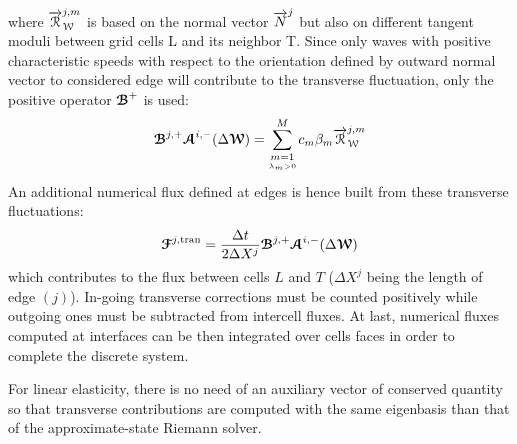 where ${\overrightarrow{\mathcal{R}}}_{\mathcal{W}}^{j,m}$ is based on the normal vector ${\overrightarrow{N}}^j$ but also on different tangent moduli between grid cells L and its neighbor T. Since only waves with positive characteristic speeds with respect to the orientation defined by outward normal vector to considered edge will contribute to the transverse fluctuation, only the positive operator ${\boldsymbol{\mathcal{B}}}^+$ is used:
\begin{equation}
{\boldsymbol{\mathcal{B}}}^{j,+} {\boldsymbol{\mathcal{A}}}^{i,-}(\Delta {\boldsymbol{\mathcal{W}}}) = \sum_{\underset{\lambda_m >0}{m=1}}^{M} c_m \beta_m {\overrightarrow{\mathcal{R}}}_{\mathcal{W}}^{j,m} \label{eq:transverse_fluctuations}
\end{equation}
An additional numerical flux defined at edges is hence built from these transverse fluctuations:
\begin{equation}
{\boldsymbol{\mathcal{F}}}^{j,\text{tran}} = \frac{\Delta t}{2 \Delta X^j} {\boldsymbol{\mathcal{B}}}^{j,+} {\boldsymbol{\mathcal{A}}}^{i,-}(\Delta {\boldsymbol{\mathcal{W}}}) \label{eq:transverse_corrections}
\end{equation}
which contributes to the flux between cells $L$ and $T$ ($\Delta X^j$ being the length of edge $(j)$). 
In-going transverse corrections must be counted positively while outgoing ones must be subtracted from intercell fluxes. At last, numerical fluxes computed at interfaces can be then integrated over cells faces in order to complete the discrete system.%


\begin{remark} 
  For linear elasticity, there is no need of an auxiliary vector of conserved quantity so that transverse contributions are computed with the same eigenbasis than that of the approximate-state Riemann solver.
\end{remark}

